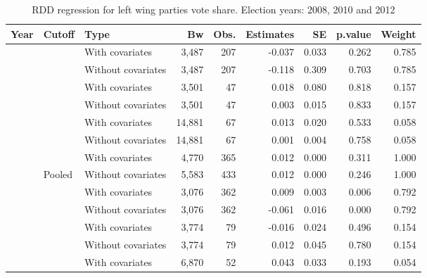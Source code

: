 \documentclass[
  12pt,
]{article}
\begin{document}
\begin{table}[H]

\caption{\label{tab:r.pct.vote}RDD regression for left wing parties vote share. Election years: 2008, 2010 and 2012}
\centering
\begin{tabular}[t]{lllrrrrrr}
\toprule
Year & Cutoff & Type & Bw & Obs. & Estimates & SE & p.value & Weight\\
\midrule
 &  & With covariates & 3,487 & 207 & -0.037 & 0.033 & 0.262 & 0.785\\


 & \multirow{-2}{*}{\raggedright\arraybackslash 20000} & Without covariates & 3,487 & 207 & -0.118 & 0.309 & 0.703 & 0.785\\


 &  & With covariates & 3,501 & 47 & 0.018 & 0.080 & 0.818 & 0.157\\


 & \multirow{-2}{*}{\raggedright\arraybackslash 40000} & Without covariates & 3,501 & 47 & 0.003 & 0.015 & 0.833 & 0.157\\


 &  & With covariates & 14,881 & 67 & 0.013 & 0.020 & 0.533 & 0.058\\


 & \multirow{-2}{*}{\raggedright\arraybackslash 60000} & Without covariates & 14,881 & 67 & 0.001 & 0.004 & 0.758 & 0.058\\


 &  & With covariates & 4,770 & 365 & 0.012 & 0.000 & 0.311 & 1.000\\


\multirow{-8}{*}{\raggedright\arraybackslash 2008} & Pooled & Without covariates & 5,583 & 433 & 0.012 & 0.000 & 0.246 & 1.000\\
\cmidrule{1-9}
 &  & With covariates & 3,076 & 362 & 0.009 & 0.003 & 0.006 & 0.792\\


 & \multirow{-2}{*}{\raggedright\arraybackslash 20000} & Without covariates & 3,076 & 362 & -0.061 & 0.016 & 0.000 & 0.792\\


 &  & With covariates & 3,774 & 79 & -0.016 & 0.024 & 0.496 & 0.154\\


 & \multirow{-2}{*}{\raggedright\arraybackslash 40000} & Without covariates & 3,774 & 79 & 0.012 & 0.045 & 0.780 & 0.154\\


 &  & With covariates & 6,870 & 52 & 0.043 & 0.033 & 0.193 & 0.054\\



\end{tabular}
\end{table}
\end{document}
